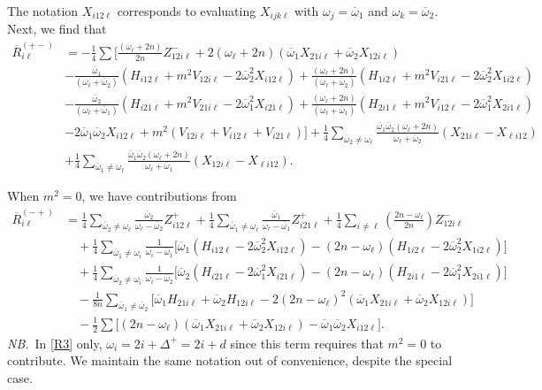 \documentclass[letterpaper,11pt]{article}
\newcommand{\oi}{\omega_i}
\newcommand{\ol}{\omega_\ell}
\newcommand{\oone}{\overline{\omega}_1}
\newcommand{\otwo}{\overline{\omega}_2}
\begin{document}
The notation $X_{i12\ell}$ corresponds to evaluating $X_{ijk\ell}$ with $\omega_j = \oone$ and $\omega_k = \otwo$. Next, we find that
\begin{align}
\label{R2}
\overline{R}_{i \ell}^{(+-)} &= - \frac{1}{4} \sum \Big[ \frac{(\ol + 2n)}{2n} Z^-_{12i\ell} + 2 (\ol + 2n) \left( \oone X_{21i\ell} + \otwo X_{12i\ell} \right) \nonumber \\
%
& -\frac{\oone}{(\ol + \otwo)} \left( H_{i12\ell} + m^2 V_{12i\ell} - 2 \otwo^2 X_{i12\ell} \right) + \frac{(\ol + 2n)}{(\ol + \otwo)} \left( H_{1i2\ell} + m^2 V_{i21\ell} - 2\otwo^2 X_{1i2\ell} \right)  \nonumber \\
%
&- \frac{\otwo}{(\ol + \oone)} \left( H_{i21\ell} + m^2 V_{21i\ell} - 2\oone^2 X_{i21\ell} \right) + \frac{(\ol + 2n)}{(\ol + \oone)} \left(H_{2i1\ell} + m^2 V_{i12\ell} - 2\oone^2 X_{2i1\ell} \right)  \nonumber \\
%
&  - 2 \oone\otwo X_{i12\ell} + m^2 \left( V_{12i\ell} + V_{i12\ell} + V_{i21\ell} \right) \Big] + \frac{1}{4} \sum_{\otwo \neq \ol} \frac{\oone\otwo(\ol + 2n)}{\ol + \otwo} \left( X_{21i\ell} - X_{\ell i 12} \right) \nonumber \\
%
& + \frac{1}{4} \sum_{\oone \neq \ol} \frac{\oone\otwo(\ol + 2n)}{\ol + \oone} \left( X_{12i\ell} - X_{\ell i 12} \right).
\end{align}

When $m^2 = 0$, we have contributions from
\begin{align}
\label{R3}
\overline{R}_{i\ell}^{(-+)} &=  \frac{1}{4} \sum_{\otwo \neq \ol} \frac{\otwo}{\ol - \otwo} Z^+_{i12\ell} + \frac{1}{4} \sum_{\oone \neq \ol} \frac{\oone}{\ol - \oone} Z^+_{i21\ell} + \frac{1}{4} \sum_{i \neq \ell} \left( \frac{2n - \ol}{2n} \right) Z^-_{12i\ell} \nonumber \\
%
& \quad + \frac{1}{4} \sum_{\oone \neq \oi} \frac{1}{\oi - \oone} \Big[ \oone \left( H_{i12\ell} - 2\otwo^2 X_{i12\ell} \right) - (2n - \ol) \left( H_{1i2\ell} - 2\otwo^2 X_{1i2\ell} \right) \Big] \nonumber \\
%
& \quad + \frac{1}{4} \sum_{\otwo \neq \oi} \frac{1}{\oi - \otwo} \Big[ \otwo \left( H_{i21\ell} - 2\oone^2 X_{i21\ell} \right) - (2n - \ol) \left( H_{2i1\ell} - 2\oone^2 X_{2i1\ell} \right) \Big] \nonumber \\
%
& \quad - \frac{1}{8n} \sum_{\oone \neq \otwo} \Big[ \oone H_{21i\ell} + \otwo H_{12i\ell} - 2 \left( 2n - \ol \right)^2 \left(\oone X_{21i\ell} + \otwo X_{12i\ell} \right) \Big] \nonumber \\
%
& \quad - \frac{1}{2} \sum \Big[ (2n - \ol) \left( \oone X_{21i\ell} + \otwo X_{12i\ell} \right) - \oone \otwo X_{i12\ell} \Big] .
\end{align}
{\it NB.}\, In \eqref{R3} only, $\oi = 2i + \Delta^+ = 2i + d$ since this term requires that $m^2 = 0$ to contribute. We maintain the same notation out of convenience, despite the special case.
\end{document}
